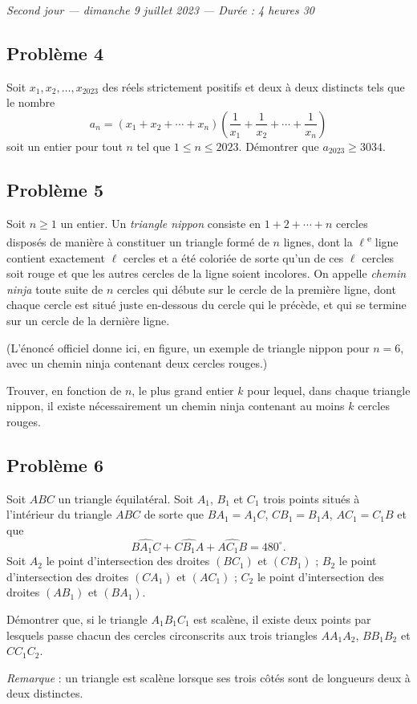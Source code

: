 \bigskip
\begin{center}
  \emph{Second jour --- dimanche 9 juillet 2023 --- Durée : 4 heures 30}
\end{center}

\subsection*{Problème 4}
Soit $x_1, x_2, \ldots, x_{2023}$ des réels strictement positifs et deux à deux distincts tels que le nombre
\[
a_n = (x_1 + x_2 + \cdots + x_n)\left(\frac{1}{x_1} + \frac{1}{x_2} + \cdots + \frac{1}{x_n}\right)
\]
soit un entier pour tout $n$ tel que $1 \leqslant n \leqslant 2023$. Démontrer que $a_{2023} \geqslant 3034$.

\subsection*{Problème 5}
Soit $n \geqslant 1$ un entier. Un \emph{triangle nippon} consiste en $1 + 2 + \cdots + n$ cercles disposés
de manière à constituer un triangle formé de $n$ lignes, dont la $\ell$\textsuperscript{e} ligne contient
exactement $\ell$ cercles et a été coloriée de sorte qu'un de ces $\ell$ cercles soit rouge et que les autres
cercles de la ligne soient incolores. On appelle \emph{chemin ninja} toute suite de $n$ cercles qui débute
sur le cercle de la première ligne, dont chaque cercle est situé juste en-dessous du cercle qui le précède,
et qui se termine sur un cercle de la dernière ligne.

(L'énoncé officiel donne ici, en figure, un exemple de triangle nippon pour $n = 6$, avec un chemin ninja
contenant deux cercles rouges.)

Trouver, en fonction de $n$, le plus grand entier $k$ pour lequel, dans chaque triangle nippon, il existe
nécessairement un chemin ninja contenant au moins $k$ cercles rouges.

\subsection*{Problème 6}
Soit $ABC$ un triangle équilatéral. Soit $A_1$, $B_1$ et $C_1$ trois points situés à l'intérieur du
triangle $ABC$ de sorte que $BA_1 = A_1C$, $CB_1 = B_1A$, $AC_1 = C_1B$ et que
\[
\widehat{BA_1C} + \widehat{CB_1A} + \widehat{AC_1B} = 480^\circ.
\]
Soit $A_2$ le point d'intersection des droites $(BC_1)$ et $(CB_1)$ ; $B_2$ le point d'intersection des
droites $(CA_1)$ et $(AC_1)$ ; $C_2$ le point d'intersection des droites $(AB_1)$ et $(BA_1)$.

Démontrer que, si le triangle $A_1B_1C_1$ est scalène, il existe deux points par lesquels passe chacun des
cercles circonscrits aux trois triangles $AA_1A_2$, $BB_1B_2$ et $CC_1C_2$.

\emph{Remarque} : un triangle est scalène lorsque ses trois côtés sont de longueurs deux à deux distinctes.
